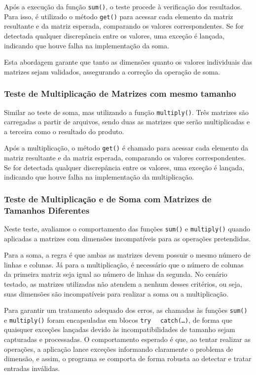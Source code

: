\documentclass[12pt]{article}
\begin{document}
    Após a execução da função \texttt{sum()}, o teste procede à verificação dos resultados. Para isso, é utilizado o método \texttt{get()} para acessar cada elemento da matriz resultante e da matriz esperada, comparando os valores correspondentes. Se for detectada qualquer discrepância entre os valores, uma exceção é lançada, indicando que houve falha na implementação da soma.
    
    Esta abordagem garante que tanto as dimensões quanto os valores individuais das matrizes sejam validados, assegurando a correção da operação de soma.
    
    
     \subsubsection{Teste de Multiplicação de Matrizes com mesmo tamanho}
    
    Similar ao teste de soma, mas utilizando a função \texttt{multiply()}. Três matrizes são carregadas a partir de arquivos, sendo duas as matrizes que serão multiplicadas e a terceira como o resultado do produto.

    Após a multiplicação, o método \texttt{get()} é chamado para acessar cada elemento da matriz resultante e da matriz esperada, comparando os valores correspondentes. Se for detectada qualquer discrepância entre os valores, uma exceção é lançada, indicando que houve falha na implementação da multiplicação.

    \subsubsection{Teste de Multiplicação e de Soma com Matrizes de Tamanhos Diferentes}

    Neste teste, avaliamos o comportamento das funções \texttt{sum()} e \texttt{multiply()} quando aplicadas a matrizes com dimensões incompatíveis para as operações pretendidas.
    
    Para a soma, a regra é que ambas as matrizes devem possuir o mesmo número de linhas e colunas. Já para a multiplicação, é necessário que o número de colunas da primeira matriz seja igual ao número de linhas da segunda. No cenário testado, as matrizes utilizadas não atendem a nenhum desses critérios, ou seja, suas dimensões são incompatíveis para realizar a soma ou a multiplicação.
    
    Para garantir um tratamento adequado dos erros, as chamadas às funções \texttt{sum()} e \texttt{multiply()} foram encapsuladas em blocos \texttt{try { }} \texttt{catch(\ldots)}, de forma que quaisquer exceções lançadas devido às incompatibilidades de tamanho sejam capturadas e processadas. O comportamento esperado é que, ao tentar realizar as operações, a aplicação lance exceções informando claramente o problema de dimensão, e assim, o programa se comporta de forma robusta ao detectar e tratar entradas inválidas.
    
\end{document}
